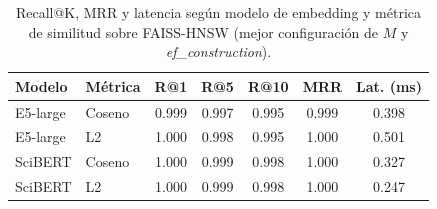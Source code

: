 \begin{table}[h]
\caption{Recall@K, MRR y latencia según modelo de embedding y métrica de similitud sobre FAISS-HNSW (mejor configuración de $M$ y \textit{ef\_construction}).}\label{tab:resultados}
\centering
\begin{tabular}{|l|l|c|c|c|c|c|}
\hline
\textbf{Modelo} & \textbf{Métrica} & \textbf{R@1} & \textbf{R@5} & \textbf{R@10} & \textbf{MRR} & \textbf{Lat. (ms)} \\
\hline
E5-large & Coseno & 0.999 & 0.997 & 0.995 & 0.999 & 0.398 \\
E5-large & L2     & 1.000 & 0.998 & 0.995 & 1.000 & 0.501 \\
SciBERT  & Coseno & 1.000 & 0.999 & 0.998 & 1.000 & 0.327 \\
SciBERT  & L2     & 1.000 & 0.999 & 0.998 & 1.000 & 0.247 \\
\hline
\end{tabular}
\end{table}